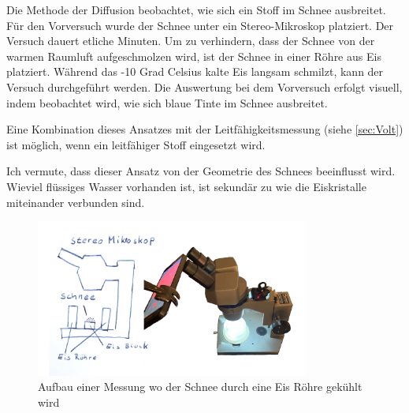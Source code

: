Die Methode der Diffusion beobachtet, wie sich ein Stoff im Schnee ausbreitet. Für den Vorversuch wurde der Schnee unter ein Stereo-Mikroskop platziert. Der Versuch dauert etliche Minuten. Um zu verhindern, dass der Schnee von der warmen Raumluft aufgeschmolzen wird, ist der Schnee in einer Röhre aus Eis platziert. Während das -10 Grad Celsius kalte Eis langsam schmilzt, kann der Versuch durchgeführt werden. Die Auswertung bei dem Vorversuch erfolgt visuell, indem beobachtet wird, wie sich blaue Tinte im Schnee ausbreitet.

Eine Kombination dieses Ansatzes mit der Leitfähigkeitsmessung (siehe \ref{sec:Volt}) ist möglich, wenn ein leitfähiger Stoff eingesetzt wird.

Ich vermute, dass dieser Ansatz von der Geometrie des Schnees beeinflusst wird. Wieviel flüssiges Wasser vorhanden ist, ist sekundär zu wie die Eiskristalle miteinander verbunden sind.

\begin{figure}[H]
    \centering
    \includegraphics[width=0.8\textwidth]{Bilder/freistellen.jpeg}
    \caption{Aufbau einer Messung wo der Schnee durch eine Eis Röhre gekühlt wird}
    \label{fig:AutMess}
\end{figure}

